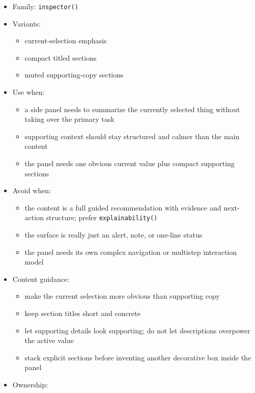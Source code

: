 \begin{itemize}
\tightlist
\item
  Family: \texttt{i\allowbreak{}n\allowbreak{}s\allowbreak{}p\allowbreak{}e\allowbreak{}c\allowbreak{}t\allowbreak{}o\allowbreak{}r\allowbreak{}(\allowbreak{})}
\item
  Variants:

  \begin{itemize}
  \tightlist
  \item
    current-selection emphasis
  \item
    compact titled sections
  \item
    muted supporting-copy sections
  \end{itemize}
\item
  Use when:

  \begin{itemize}
  \tightlist
  \item
    a side panel needs to summarize the currently selected thing without taking over the primary task
  \item
    supporting context should stay structured and calmer than the main content
  \item
    the panel needs one obvious current value plus compact supporting sections
  \end{itemize}
\item
  Avoid when:

  \begin{itemize}
  \tightlist
  \item
    the content is a full guided recommendation with evidence and next-action structure; prefer \texttt{e\allowbreak{}x\allowbreak{}p\allowbreak{}l\allowbreak{}a\allowbreak{}i\allowbreak{}n\allowbreak{}a\allowbreak{}b\allowbreak{}i\allowbreak{}l\allowbreak{}i\allowbreak{}t\allowbreak{}y\allowbreak{}(\allowbreak{})}
  \item
    the surface is really just an alert, note, or one-line status
  \item
    the panel needs its own complex navigation or multistep interaction model
  \end{itemize}
\item
  Content guidance:

  \begin{itemize}
  \tightlist
  \item
    make the current selection more obvious than supporting copy
  \item
    keep section titles short and concrete
  \item
    let supporting details look supporting; do not let descriptions overpower the active value
  \item
    stack explicit sections before inventing another decorative box inside the panel
  \end{itemize}
\item
  Ownership:


\end{itemize}
